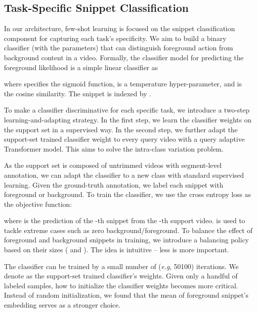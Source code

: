\documentclass{bmvc2k}
\def\eg{\emph{e.g}\bmvaOneDot}
\begin{document}
\subsection{Task-Specific Snippet Classification}
\label{sec:classification}
In our architecture, few-shot learning is focused on the snippet classification component for capturing each task's specificity.
We aim to build a binary classifier  (with  the parameters) that can distinguish foreground action from background content in a video.
Formally, the classifier model for predicting the foreground likelihood is a simple linear classifier as

where  specifies the sigmoid function,
 is a temperature hyper-parameter, and  is the cosine similarity. 
The snippet is indexed by .



To make a classifier discriminative for each specific task, we introduce a two-step learning-and-adapting strategy.
In the first step,
we learn the classifier weights on the support set
in a supervised way.
In the second step,
we further adapt the support-set trained classifier weight
to every query video with a query adaptive Transformer model.
This aims to solve the intra-class variation problem.




As the support set is composed of untrimmed videos with segment-level annotation, 
we can adapt the classifier to a new class with standard supervised learning.
Given the ground-truth annotation,
we label each snippet with foreground or background.
To train the classifier, we use the cross entropy loss as the objective function:



where 
is the prediction of the -th snippet 
from the -th support video.
 is used to tackle extreme cases
such as zero background/foreground.
To balance the effect of foreground and background snippets in training, we introduce a balancing policy based on their sizes
( and ).
The idea is intuitive -- less is more important.




The classifier can be trained by a small number of (\eg, 50100) iterations.
We denote  as the support-set trained classifier's weights.
Given only a handful of labeled samples,
how to initialize the classifier weights becomes more critical. Instead of random initialization, we found that the mean of foreground snippet's embedding serves as a stronger choice.
\end{document}
